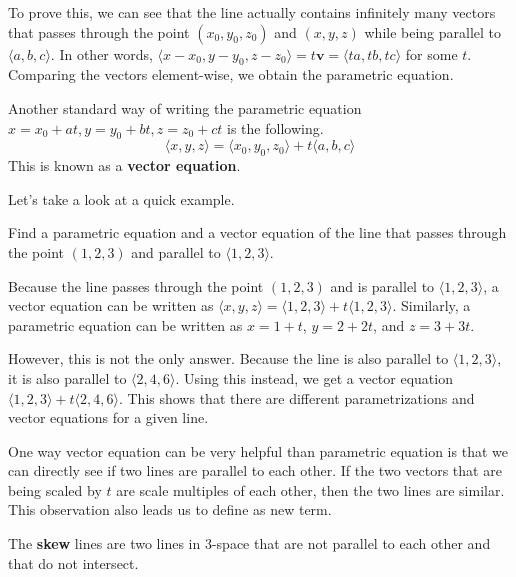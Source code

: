 \documentclass[../../main.tex]{subfiles}
\begin{document}
To prove this, we can see that the line actually contains infinitely
many vectors that passes through the point $(x_0, y_0, z_0)$ and
$(x, y, z)$ while being parallel to $\langle a, b, c \rangle$.
In other words, $\langle x - x_0, y - y_0, z - z_0 \rangle =
t\mathbf{v} = \langle ta, tb, tc \rangle$ for some $t$. Comparing
the vectors element-wise, we obtain the parametric equation.

\begin{important}
Another standard way of writing the parametric equation
$x = x_0 + at, y = y_0 + bt, z = z_0 + ct$ is the following.
\[
\langle x, y, z \rangle
= \langle x_0, y_0, z_0 \rangle + t \langle a, b, c \rangle
\]
This is known as a \textbf{vector equation}.
\end{important}

Let's take a look at a quick example.

\begin{problem}{}{}
Find a parametric equation and a vector equation of the line
that passes through the point $(1, 2, 3)$ and parallel to
$\langle 1, 2, 3 \rangle$.
\end{problem}
\begin{solution}
Because the line passes through the point $(1, 2, 3)$ and is
parallel to $\langle 1, 2, 3 \rangle$, a vector equation
can be written as $\langle x, y, z \rangle = \langle 1, 2, 3 \rangle
+ t \langle 1, 2, 3 \rangle$. Similarly, a parametric equation
can be written as $x = 1 + t$, $y = 2 + 2t$, and $z = 3 + 3t$.
\end{solution}

However, this is not the only answer. Because the line is
also parallel to $\langle 1, 2, 3 \rangle$, it is also parallel
to $\langle 2, 4, 6 \rangle$. Using this instead, we get a
vector equation $\langle 1, 2, 3 \rangle + t \langle 2, 4, 6 \rangle$.
This shows that there are different parametrizations and vector
equations for a given line.

One way vector equation can be very helpful than parametric equation
is that we can directly see if two lines are parallel to each other.
If the two vectors that are being scaled by $t$ are scale multiples
of each other, then the two lines are similar. This observation
also leads us to define as new term.

\begin{definition}{}{}
The \textbf{skew} lines are two lines in 3-space that are not
parallel to each other and that do not intersect.
\end{definition}
\end{document}

